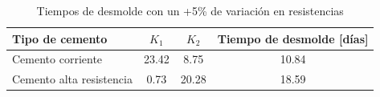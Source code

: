 \begin{table}[H]
\centering
\caption{Tiempos de desmolde con un +5\% de variación en resistencias}
\renewcommand{\arraystretch}{1.2}
\small
\begin{tabular}{lccc}
\hline
Tipo de cemento & $K_1$ & $K_2$ & Tiempo de desmolde [días] \\ 
\hline
Cemento corriente & 23.42 & 8.75 & 10.84 \\ 
Cemento alta resistencia & 0.73 & 20.28 & 18.59 \\ 
\hline
\end{tabular}
\end{table}


